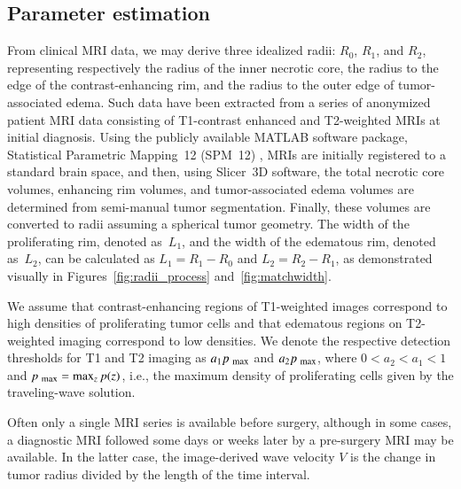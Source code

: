 \documentclass{aims}
\numberwithin{equation}{section}
\begin{document}
\subsection{Parameter estimation}
\label{paramest-sec}

From clinical MRI data, we may derive three idealized radii:
$R_{0}$, $R_{1}$, and $R_{2}$, representing respectively the radius of the
inner necrotic core, the radius to the edge of the contrast-enhancing rim,
and the radius to the outer edge of tumor-associated edema.  Such data have
been extracted from a series of anonymized patient MRI data consisting of
T1-contrast enhanced and T2-weighted MRIs at initial diagnosis.  Using
the publicly available MATLAB software package, Statistical Parametric Mapping~12 (SPM~12) \cite{Penny2007}, MRIs are initially registered to a standard brain
space, and then, using Slicer~3D \cite{Fedorov2012} software, the total necrotic core
volumes, enhancing rim volumes, and tumor-associated edema volumes are
determined from semi-manual tumor segmentation.  Finally, these volumes are
converted to radii assuming a spherical tumor geometry.  The width of the
proliferating rim, denoted as~$L_{1}$, and the width of the edematous rim,
denoted as~$L_{2}$, can be calculated as $L_{1}=R_{1}-R_{0}$ and
$L_{2}=R_{2}-R_{1}$, as demonstrated visually in
Figures~\ref{fig:radii_process} and~\ref{fig:matchwidth}.

We assume that contrast-enhancing regions of T1-weighted images
correspond to high densities of proliferating tumor cells and that edematous
regions on T2-weighted imaging correspond to low densities.  We denote the
respective detection thresholds for T1 and T2 imaging as
$a_1p_{\mbox{\scriptsize max}}$ and $a_2 p_{\mbox{\scriptsize max}}$,
where $0 < a_2 < a_1 < 1$ and 
$p_{\mbox{\scriptsize max}}=\max_{z} p(z)$,
i.e., the maximum density of proliferating cells given by the traveling-wave
solution.

Often only a single MRI series is available before surgery, although in some
cases, a diagnostic MRI followed some days or weeks later by a pre-surgery MRI
may be available.  In the latter case, the
image-derived wave velocity $V$ is the change in tumor radius divided
by the length of the time interval.
\end{document}
